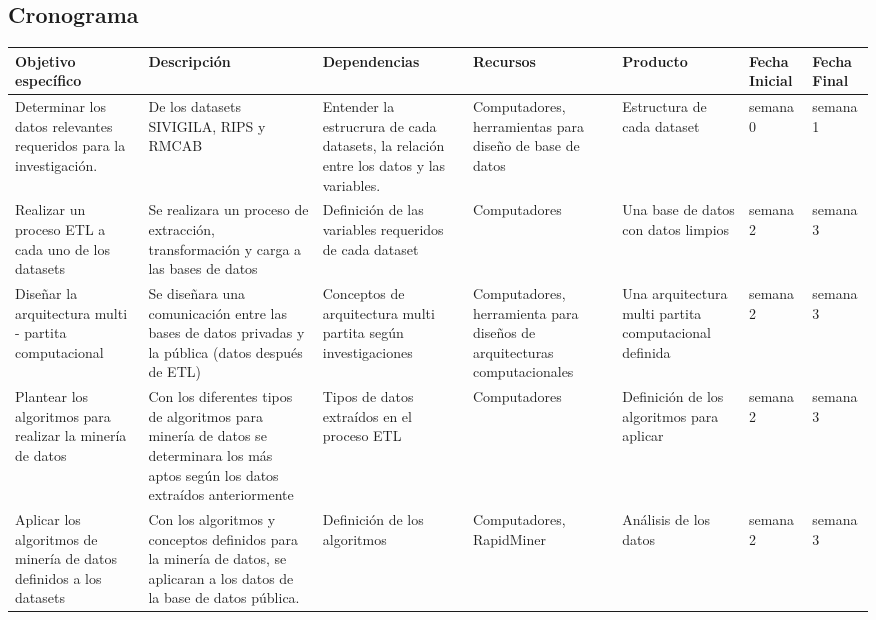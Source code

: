 \documentclass[a4paper, 11pt, oneside]{article}
\theoremstyle{definition}
\theoremstyle{remark}
\begin{document}
\begin{sidewaystable}
\begin{center}
\section{Cronograma}
\end{center}


\begin{center}

\begin{tabular}{p{4cm} p{4cm} p{4cm} p{4cm} p{3cm} p{2cm} p{2cm} }
\toprule
\rowcolor[gray]{0.8}Objetivo específico & Descripción & Dependencias & Recursos  & Producto &
Fecha Inicial & Fecha Final \\
\midrule
Determinar los datos relevantes requeridos para la investigación. & De los datasets SIVIGILA, RIPS y RMCAB & Entender la estrucrura de cada datasets, la relación entre los datos y las variables. & Computadores, herramientas para diseño de base de datos & Estructura de cada dataset & semana 0 & semana 1 \\
\midrule
Realizar un proceso ETL a cada uno de los datasets & Se realizara un proceso de extracción, transformación y carga a las bases de datos & Definición de las variables requeridos de cada dataset & Computadores & Una base de datos con datos limpios & semana 2 & semana 3 \\
\midrule
Diseñar la arquitectura multi - partita computacional & Se diseñara una comunicación entre las bases de datos privadas y la pública (datos después de ETL) & Conceptos de arquitectura multi partita según investigaciones & Computadores, herramienta para diseños de arquitecturas computacionales & Una arquitectura multi partita computacional definida & semana 2 & semana 3 \\

\midrule
Plantear los algoritmos para realizar la minería de datos & Con los diferentes tipos de algoritmos para minería de datos se determinara los más aptos según los datos extraídos anteriormente & Tipos de datos extraídos en el proceso ETL & Computadores & Definición de los algoritmos para aplicar & semana 2 & semana 3 \\

\midrule
Aplicar los algoritmos de minería de datos definidos a los datasets & Con los algoritmos y conceptos definidos para la minería de datos, se aplicaran a los datos de la base de datos pública. & Definición de los algoritmos & Computadores, RapidMiner & Análisis de los datos & semana 2 & semana 3 \\


\end{tabular}
\end{center}
\end{sidewaystable}
\end{document}
